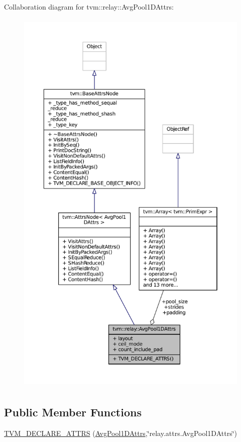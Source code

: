 Collaboration diagram for tvm\+:\+:relay\+:\+:Avg\+Pool1\+D\+Attrs\+:
\nopagebreak
\begin{figure}[H]
\begin{center}
\leavevmode
\includegraphics[height=550pt]{structtvm_1_1relay_1_1AvgPool1DAttrs__coll__graph}
\end{center}
\end{figure}
\subsection*{Public Member Functions}
\begin{DoxyCompactItemize}
\item 
\hyperlink{structtvm_1_1relay_1_1AvgPool1DAttrs_a37ecac5be7dfacab86f4c73d98f9aa03}{T\+V\+M\+\_\+\+D\+E\+C\+L\+A\+R\+E\+\_\+\+A\+T\+T\+RS} (\hyperlink{structtvm_1_1relay_1_1AvgPool1DAttrs}{Avg\+Pool1\+D\+Attrs},\char`\"{}relay.\+attrs.\+Avg\+Pool1\+D\+Attrs\char`\"{})
\end{DoxyCompactItemize}
